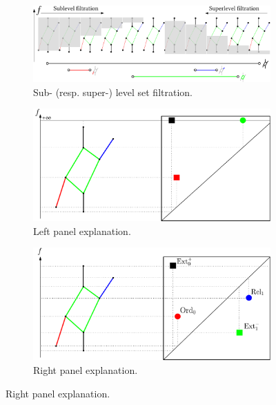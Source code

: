 \begin{figure}[t]
  \centering
  \begin{subfigure}{\linewidth}
    \centering
    \includegraphics[width=\linewidth]{figs/ph/expers_v2.pdf}
    \caption{Sub- (resp. super-) level set filtration.}
    \label{fig:filtrations_top}
  \end{subfigure}

  \vspace{0.5em} %

  \begin{subfigure}{0.48\linewidth}
    \centering
    \includegraphics[width=\linewidth]{figs/ph/expers2_ord_v2.pdf}
    \caption{Left panel explanation.}
    \label{fig:filtrations_left}
  \end{subfigure}\hfill
  \begin{subfigure}{0.48\linewidth}
    \centering
    \includegraphics[width=\linewidth]{figs/ph/expers2_v2.pdf}
    \caption{Right panel explanation.}
    \label{fig:filtrations_right}
  \end{subfigure}


\end{figure}
